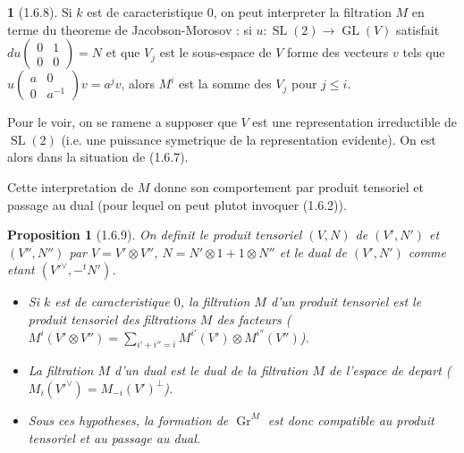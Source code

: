 \documentclass[12pt,a4paper]{article}
\theoremstyle{plain}
\newtheorem{proposition}[theorem]{Proposition}
\theoremstyle{definition}
\theoremstyle{definition}
\newtheorem{para}{}[section]
\theoremstyle{remark}
\DeclareMathOperator{\GL}{GL}
\DeclareMathOperator{\Gr}{Gr}
\DeclareMathOperator{\SL}{SL}
\begin{document}
\begin{para}[1.6.8]
Si $k$ est de caracteristique $0$, on peut interpreter la filtration $M$ en terme du theoreme de Jacobson-Morosov : si $u: \SL(2) \to \GL(V)$ satisfait $du(\begin{smallmatrix} 0&1\\0&0 \end{smallmatrix}) = N$ et que $V_j$ est le sous-espace de $V$ forme des vecteurs $v$ tels que $u(\begin{smallmatrix} a&0\\0&a^{-1} \end{smallmatrix}) v = a^j v$, alors $M^i$ est la somme des $V_j$ pour $j \leq i$.

Pour le voir, on se ramene a supposer que $V$ est une representation irreductible de $\SL(2)$ (i.e. une puissance symetrique de la representation evidente). On est alors dans la situation de (1.6.7).

Cette interpretation de $M$ donne son comportement par produit tensoriel et passage au dual (pour lequel on peut plutot invoquer (1.6.2)).
\end{para}

\begin{proposition}[1.6.9]
On definit le produit tensoriel $(V, N)$ de $(V', N')$ et $(V'', N'')$ par $V = V' \otimes V''$, $N = N' \otimes 1 + 1 \otimes N''$ et le dual de $(V', N')$ comme etant $(V'^\vee, -^tN')$.
\begin{itemize}[nosep]
\item[(i)] Si $k$ est de caracteristique $0$, la filtration $M$ d'un produit tensoriel est le produit tensoriel des filtrations $M$ des facteurs ($M^i(V' \otimes V'') = \sum_{i'+i''=i} M^{i'}(V') \otimes M^{i''}(V'')$).
\item[(ii)] La filtration $M$ d'un dual est le dual de la filtration $M$ de l'espace de depart ($M_i(V'^\vee) = M_{-i}(V')^\perp$).
\item[(iii)] Sous ces hypotheses, la formation de $\Gr^M$ est donc compatible au produit tensoriel et au passage au dual.
\end{itemize}
\end{proposition}
\end{document}
